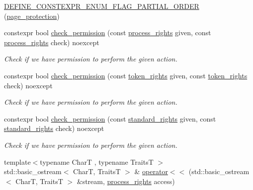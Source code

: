 \begin{DoxyCompactItemize}
\item 
\mbox{\hyperlink{namespacedistant_ad18c01cdb15ac30cc3dcbd2049b62e33}{D\+E\+F\+I\+N\+E\+\_\+\+C\+O\+N\+S\+T\+E\+X\+P\+R\+\_\+\+E\+N\+U\+M\+\_\+\+F\+L\+A\+G\+\_\+\+P\+A\+R\+T\+I\+A\+L\+\_\+\+O\+R\+D\+ER}} (\mbox{\hyperlink{structdistant_1_1access__rights_a09c6caea8f570f8e2d18c3ef2e2a7804}{page\+\_\+protection}})
\item 
constexpr bool \mbox{\hyperlink{namespacedistant_ad196fc4c5f60612f687d662f2c6b4362}{check\+\_\+permission}} (const \mbox{\hyperlink{structdistant_1_1access__rights_ae153052a690584111c46ec7a78d1ef81}{process\+\_\+rights}} given, const \mbox{\hyperlink{structdistant_1_1access__rights_ae153052a690584111c46ec7a78d1ef81}{process\+\_\+rights}} check) noexcept
\begin{DoxyCompactList}\small\item\em Check if we have permission to perform the given action. \end{DoxyCompactList}\item 
constexpr bool \mbox{\hyperlink{namespacedistant_ab4c8d0b26c0d701a24aa376f1a3f72d1}{check\+\_\+permission}} (const \mbox{\hyperlink{structdistant_1_1access__rights_a6b4d9e837868c8c15cf407e4c80d7f3c}{token\+\_\+rights}} given, const \mbox{\hyperlink{structdistant_1_1access__rights_a6b4d9e837868c8c15cf407e4c80d7f3c}{token\+\_\+rights}} check) noexcept
\begin{DoxyCompactList}\small\item\em Check if we have permission to perform the given action. \end{DoxyCompactList}\item 
constexpr bool \mbox{\hyperlink{namespacedistant_a05d464175f86520364e566dd7ee21dc4}{check\+\_\+permission}} (const \mbox{\hyperlink{structdistant_1_1access__rights_a1aa121d7e246b51f7386f992adce1664}{standard\+\_\+rights}} given, const \mbox{\hyperlink{structdistant_1_1access__rights_a1aa121d7e246b51f7386f992adce1664}{standard\+\_\+rights}} check) noexcept
\begin{DoxyCompactList}\small\item\em Check if we have permission to perform the given action. \end{DoxyCompactList}\item 
{\footnotesize template$<$typename CharT , typename TraitsT $>$ }\\std\+::basic\+\_\+ostream$<$ CharT, TraitsT $>$ \& \mbox{\hyperlink{namespacedistant_adc41c1da8271c21baad8dd69328f8066}{operator$<$$<$}} (std\+::basic\+\_\+ostream$<$ CharT, TraitsT $>$ \&stream, \mbox{\hyperlink{structdistant_1_1access__rights_ae153052a690584111c46ec7a78d1ef81}{process\+\_\+rights}} access)

\end{DoxyCompactItemize}
